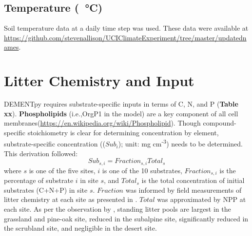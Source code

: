 \documentclass[letterpaper, 10pt]{article}
\begin{document}
\subsection{Temperature (\SI{}{\celsius})}
Soil temperature data at a daily time step was used. These data were available at \url{https://github.com/stevenallison/UCIClimateExperiment/tree/master/updatednames}. 


\section{\large Litter Chemistry and Input}
DEMENTpy requires substrate-specific inputs in terms of C, N, and P (\textbf{Table xx}). \textbf{Phospholipids} (i.e.,OrgP1 in the model) are a key component of all cell membranes(\url{https://en.wikipedia.org/wiki/Phospholipid}). Though compound-specific stoichiometry is clear for determining concentration by element, substrate-specific concentration (($Sub_i$); unit: mg cm\textsuperscript{-3}) needs to be determined. This derivation followed:
\begin{equation}
  Sub_{s,i} = Fraction_{s,i} Total_s 
\end{equation}
where $s$ is one of the five sites, $i$ is one of the 10 substrates, $Fraction_{s,i}$ is the percentage of substrate $i$ in site $s$, and $Total_s$ is the total concentration of initial substrates (C+N+P) in site $s$.  $Fraction$ was informed by field measurements of litter chemistry at each site as presented in \citet{baker2017extracellular}. $Total$ was approximated by NPP at each site. As per the observation by \citet{baker2017extracellular}, standing litter pools are largest in the grassland and pine-oak site, reduced in the subalpine site, significantly reduced in the scrubland site, and negligible in the desert site.




\end{document}
